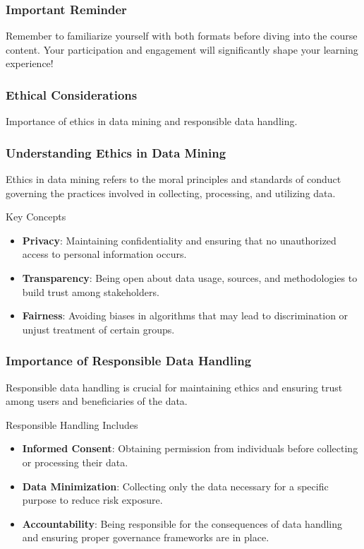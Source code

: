\documentclass[aspectratio=169]{beamer}
\begin{document}
\begin{frame}[fragile]
    \frametitle{Important Reminder}
    \centering
    Remember to familiarize yourself with both formats before diving into the course content. Your participation and engagement will significantly shape your learning experience!
\end{frame}

\begin{frame}[fragile]
    \frametitle{Ethical Considerations}
    Importance of ethics in data mining and responsible data handling.
\end{frame}

\begin{frame}[fragile]
    \frametitle{Understanding Ethics in Data Mining}
    Ethics in data mining refers to the moral principles and standards of conduct governing the practices involved in collecting, processing, and utilizing data.

    \begin{block}{Key Concepts}
        \begin{itemize}
            \item \textbf{Privacy}: Maintaining confidentiality and ensuring that no unauthorized access to personal information occurs.
            \item \textbf{Transparency}: Being open about data usage, sources, and methodologies to build trust among stakeholders.
            \item \textbf{Fairness}: Avoiding biases in algorithms that may lead to discrimination or unjust treatment of certain groups.
        \end{itemize}
    \end{block}
\end{frame}

\begin{frame}[fragile]
    \frametitle{Importance of Responsible Data Handling}
    Responsible data handling is crucial for maintaining ethics and ensuring trust among users and beneficiaries of the data.

    \begin{block}{Responsible Handling Includes}
        \begin{itemize}
            \item \textbf{Informed Consent}: Obtaining permission from individuals before collecting or processing their data.
            \item \textbf{Data Minimization}: Collecting only the data necessary for a specific purpose to reduce risk exposure.
            \item \textbf{Accountability}: Being responsible for the consequences of data handling and ensuring proper governance frameworks are in place.
        \end{itemize}
    \end{block}
\end{frame}
\end{document}
